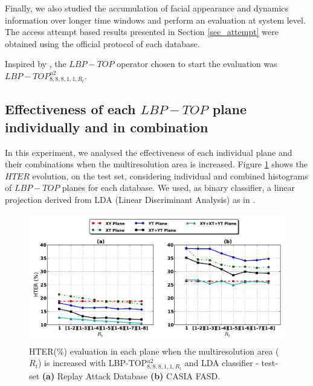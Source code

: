 Finally, we also studied the accumulation of facial appearance and dynamics information over longer time windows and perform an evaluation at system level. The access attempt based results presented in Section \ref{sec_attempt} were obtained using the official protocol of each database.

Inspired by \cite{ChingovskaBIOSIG2012}, the $LBP-TOP$ operator chosen to start the evaluation was $LBP-TOP_{8,8,8,1,1,R_{t}}^{u2}$. 

\subsection{Effectiveness of each $LBP-TOP$ plane individually and in combination}
\label{sec_lbptop_planes}

In this experiment, we analysed the effectiveness of each individual plane and their combinations when the multiresolution area is increased. Figure \ref{fig:planes_evaluation_LDA} shows the $HTER$ evolution, on the test set, considering individual and combined histograms of $LBP-TOP$ planes for each database. We used, as binary classifier, a linear projection derived from LDA (Linear Discriminant Analysis) as in \cite{ChingovskaBIOSIG2012}.

\begin{figure}[!htb]
\begin{center}
\includegraphics [width=\textwidth] {images/proposed_countermeasure/planes_evaluation_LDA.pdf}
\caption[HTER(\%) evaluation in each plane when the multiresolution area ($R_t$) is increased]{HTER(\%) evaluation in each plane when the multiresolution area ($R_t$) is increased with LBP-TOP$_{8,8,8,1,1,R_t}^{u2}$ and LDA classifier - test-set \textbf{(a)} Replay Attack Database \textbf{(b)} CASIA FASD.} \label{fig:planes_evaluation_LDA}
\end{center}
\end{figure}


